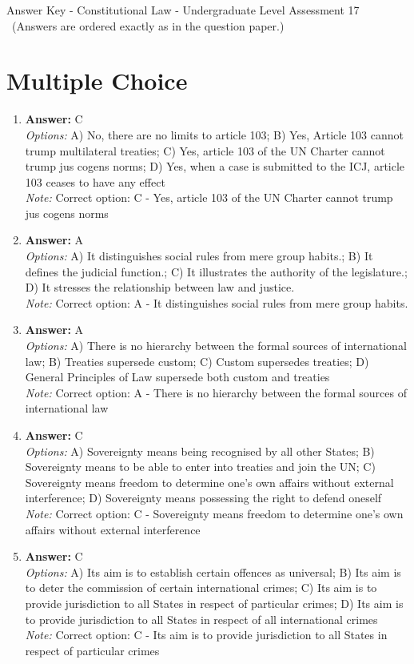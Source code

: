 \documentclass[12pt]{article}
\begin{document}
\begin{center}
Answer Key - Constitutional Law - Undergraduate Level Assessment 17 \
\small (Answers are ordered exactly as in the question paper.)
\end{center}

\section*{Multiple Choice}
\begin{enumerate}[label=\arabic*.]
\item \textbf{Answer:} C
\\ \textit{Options:} A) No, there are no limits to article 103; B) Yes, Article 103 cannot trump multilateral treaties; C) Yes, article 103 of the UN Charter cannot trump jus cogens norms; D) Yes, when a case is submitted to the ICJ, article 103 ceases to have any effect
\\ \textit{Note:} Correct option: C - Yes, article 103 of the UN Charter cannot trump jus cogens norms
\item \textbf{Answer:} A
\\ \textit{Options:} A) It distinguishes social rules from mere group habits.; B) It defines the judicial function.; C) It illustrates the authority of the legislature.; D) It stresses the relationship between law and justice.
\\ \textit{Note:} Correct option: A - It distinguishes social rules from mere group habits.
\item \textbf{Answer:} A
\\ \textit{Options:} A) There is no hierarchy between the formal sources of international law; B) Treaties supersede custom; C) Custom supersedes treaties; D) General Principles of Law supersede both custom and treaties
\\ \textit{Note:} Correct option: A - There is no hierarchy between the formal sources of international law
\item \textbf{Answer:} C
\\ \textit{Options:} A) Sovereignty means being recognised by all other States; B) Sovereignty means to be able to enter into treaties and join the UN; C) Sovereignty means freedom to determine one's own affairs without external interference; D) Sovereignty means possessing the right to defend oneself
\\ \textit{Note:} Correct option: C - Sovereignty means freedom to determine one's own affairs without external interference
\item \textbf{Answer:} C
\\ \textit{Options:} A) Its aim is to establish certain offences as universal; B) Its aim is to deter the commission of certain international crimes; C) Its aim is to provide jurisdiction to all States in respect of particular crimes; D) Its aim is to provide jurisdiction to all States in respect of all international crimes
\\ \textit{Note:} Correct option: C - Its aim is to provide jurisdiction to all States in respect of particular crimes
\end{enumerate}
\end{document}
